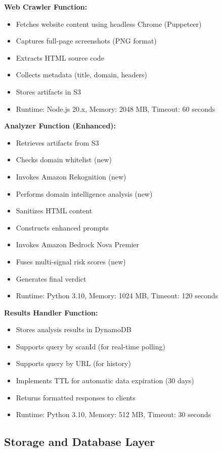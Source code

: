 \documentclass[conference]{IEEEtran}
\begin{document}
\textbf{Web Crawler Function:}
\begin{itemize}
\item Fetches website content using headless Chrome (Puppeteer)
\item Captures full-page screenshots (PNG format)
\item Extracts HTML source code
\item Collects metadata (title, domain, headers)
\item Stores artifacts in S3
\item Runtime: Node.js 20.x, Memory: 2048 MB, Timeout: 60 seconds
\end{itemize}

\textbf{Analyzer Function (Enhanced):}
\begin{itemize}
\item Retrieves artifacts from S3
\item Checks domain whitelist (new)
\item Invokes Amazon Rekognition (new)
\item Performs domain intelligence analysis (new)
\item Sanitizes HTML content
\item Constructs enhanced prompts
\item Invokes Amazon Bedrock Nova Premier
\item Fuses multi-signal risk scores (new)
\item Generates final verdict
\item Runtime: Python 3.10, Memory: 1024 MB, Timeout: 120 seconds
\end{itemize}

\textbf{Results Handler Function:}
\begin{itemize}
\item Stores analysis results in DynamoDB
\item Supports query by scanId (for real-time polling)
\item Supports query by URL (for history)
\item Implements TTL for automatic data expiration (30 days)
\item Returns formatted responses to clients
\item Runtime: Python 3.10, Memory: 512 MB, Timeout: 30 seconds
\end{itemize}

\subsection{Storage and Database Layer}
\end{document}
